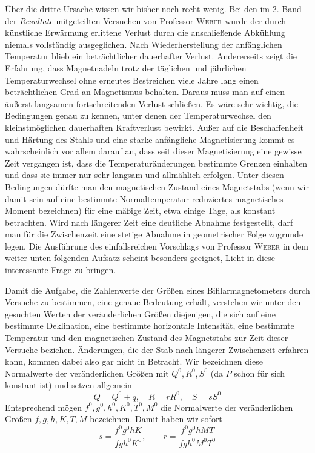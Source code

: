 Über die dritte Ursache wissen wir bisher noch recht wenig. Bei den im 2. Band der \textit{Resultate} mitgeteilten Versuchen von Professor \textsc{Weber} wurde der durch künstliche Erwärmung erlittene Verlust durch die anschließende Abkühlung niemals vollständig ausgeglichen.
Nach Wiederherstellung der anfänglichen Temperatur blieb ein beträchtlicher dauerhafter Verlust. Andererseits zeigt die Erfahrung, dass Magnetnadeln trotz der täglichen und jährlichen Temperaturwechsel ohne erneutes Bestreichen viele Jahre lang einen beträchtlichen Grad an Magnetismus behalten. Daraus muss man auf einen äußerst langsamen fortschreitenden Verlust schließen. Es wäre sehr wichtig, die Bedingungen genau zu kennen, unter denen der Temperaturwechsel den kleinstmöglichen dauerhaften Kraftverlust bewirkt. Außer auf die Beschaffenheit und Härtung des Stahls und eine starke anfängliche Magnetisierung kommt es wahrscheinlich vor allem darauf an, dass seit dieser Magnetisierung eine gewisse Zeit vergangen ist, dass die Temperaturänderungen bestimmte Grenzen einhalten und dass sie immer nur sehr langsam und allmählich erfolgen. Unter diesen Bedingungen dürfte man den magnetischen Zustand eines Magnetstabs (wenn wir damit sein auf eine bestimmte Normaltemperatur reduziertes magnetisches Moment bezeichnen) für eine mäßige Zeit, etwa einige Tage, als konstant betrachten. Wird nach längerer Zeit eine deutliche Abnahme festgestellt, darf man für die Zwischenzeit eine stetige Abnahme in geometrischer Folge zugrunde legen. Die Ausführung des einfallsreichen Vorschlags von Professor \textsc{Weber} in dem weiter unten folgenden Aufsatz scheint besonders geeignet, Licht in diese interessante Frage zu bringen.

Damit die Aufgabe, die Zahlenwerte der Größen eines Bifilarmagnetometers durch Versuche zu bestimmen, eine genaue Bedeutung erhält, verstehen wir unter den gesuchten Werten der veränderlichen Größen diejenigen, die sich auf eine bestimmte Deklination, eine bestimmte horizontale Intensität, eine bestimmte Temperatur und den magnetischen Zustand des
Magnetstabs zur Zeit dieser Versuche beziehen. Änderungen, die der Stab nach längerer Zwischenzeit erfahren kann, kommen dabei also gar nicht in Betracht. Wir bezeichnen diese Normalwerte der veränderlichen Größen mit $Q^0,R^0,S^0$ (da $P$ schon für sich konstant ist) und setzen allgemein
\[
Q=Q^0+q,\quad R=rR^0,\quad S=sS^0
\]
Entsprechend mögen $f^0,g^0,h^0,K^0,T^0,M^0$ die Normalwerte der veränderlichen Größen $f,g,h,K,T,M$ bezeichnen. Damit haben wir sofort
\[
s=\frac{f^0g^0hK}{fgh^0K^0},\qquad r=\frac{f^0g^0hMT}{fgh^0M^0T^0}
\]


